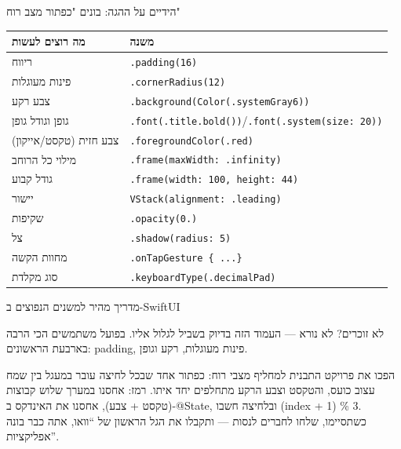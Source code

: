 \begin{tcbpractice}{הידיים על ההגה: בונים "כפתור מצב רוח"}

\begin{center}
\begin{tabularx}{\linewidth}{|X|X|}
\hline
\textbf{מה רוצים לעשות} & \textbf{משנה} \tabularnewline
\hline
ריווח & \texttt{.\allowbreak padding(16)} \tabularnewline
פינות מעוגלות & \texttt{.\allowbreak cornerRadius(12)} \tabularnewline
צבע רקע & \texttt{.\allowbreak background(Color(.\allowbreak systemGray6))} \tabularnewline
גופן וגודל גופן & \texttt{.\allowbreak font(.\allowbreak title.\allowbreak bold())}/\texttt{.\allowbreak font(.\allowbreak system(size: 20))} \tabularnewline
צבע חזית (טקסט/אייקון) & \texttt{.\allowbreak foregroundColor(.\allowbreak red)} \tabularnewline
מילוי כל הרוחב & \texttt{.\allowbreak frame(maxWidth: .\allowbreak infinity)} \tabularnewline
גודל קבוע & \texttt{.\allowbreak frame(width: 100, height: 44)} \tabularnewline
יישור & \texttt{VStack(alignment: .\allowbreak leading)} \tabularnewline
שקיפות & \texttt{.\allowbreak opacity(0.\allowbreak 6)} \tabularnewline
צל & \texttt{.\allowbreak shadow(radius: 5)} \tabularnewline
מחוות הקשה & \texttt{.\allowbreak onTapGesture \{ .\allowbreak .\allowbreak .\allowbreak  \}} \tabularnewline
סוג מקלדת & \texttt{.\allowbreak keyboardType(.\allowbreak decimalPad)} \tabularnewline
\hline
\end{tabularx}
\end{center}

\begin{center}\small\color{gray}מדריך מהיר למשנים הנפוצים ב-SwiftUI\end{center}

לא זוכרים? לא נורא — העמוד הזה בדיוק בשביל לגלול אליו. בפועל משתמשים הכי הרבה בארבעת הראשונים: padding, פינות מעוגלות, רקע וגופן.

הפכו את פרויקט התבנית למחליף מצבי רוח: כפתור אחד שבכל לחיצה עובר במעגל בין שמח עצוב כועס, והטקסט וצבע הרקע מתחלפים יחד איתו. רמז: אחסנו במערך שלוש קבוצות (טקסט + צבע), אחסנו את האינדקס ב-@State, ובלחיצה חשבו (index + 1) \% 3. כשתסיימו, שלחו לחברים לנסות — ותקבלו את הגל הראשון של “וואו, אתה כבר בונה אפליקציות”.

\end{tcbpractice}

